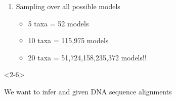 \begin{frame}[t,label=fullmodel]
\begin{minipage}[t][0.35\textheight][c]{1.2\linewidth}
\begin{onlyenv}
\begin{enumerate}
\begin{itemize}
                    \item<10-> Approximate likelihood
                \end{itemize}
                \item<11-> Sampling over all possible models
                \begin{itemize}
                    \item<12-> 5 taxa = 52 models
                    \item<13-> 10 taxa = 115,975 models
                    \item<14-> 20 taxa = 51,724,158,235,372 models!!
                \end{itemize}
            \end{enumerate}
        \end{onlyenv}
    \end{minipage}

    \vspace{1mm}

    \begin{minipage}[t][0.45\textheight][t]{\linewidth}
        \begin{uncoverenv}<2-6>
            \begin{center}
                We want to infer \textcolor{blue}{\divModel{}} and
                \textcolor{blue}{\divTimeMapVector} given DNA sequence
                alignments
                \textcolor{blue}{\alignmentVector}
            \end{center}
        \end{uncoverenv}



\end{minipage}
\end{frame}

